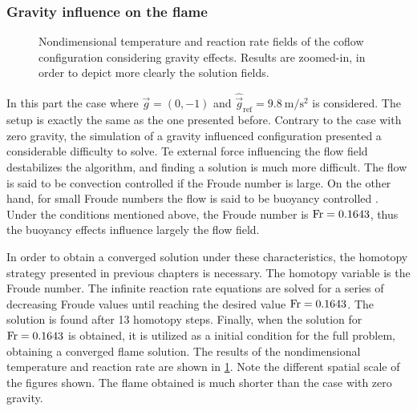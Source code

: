 \subsubsection{Gravity influence on the flame}
\begin{figure}[tbh!]
	\centering
	\pgfplotsset{width=0.35\textwidth, compat=1.3}
	\caption[Nondimensional temperature and reaction rate fields of the coflow configuration considering gravity effects.]{Nondimensional temperature and reaction rate fields of the coflow configuration considering gravity effects. Results are zoomed-in, in order to depict more clearly the solution fields.} \label{fig:CoFlowFlameFigWithGravity}
\end{figure}
In this part the case where $\vec{g} = (0, -1)$ and $\hat{\vec{g}}_{\text{ref}} = \SI{9.8}{\meter\per\square\second }$ is considered. The setup is exactly the same as the one presented before. Contrary to the case with zero gravity, the simulation of a gravity influenced configuration presented a considerable difficulty to solve. Te external force influencing the flow field destabilizes the algorithm, and finding a solution is much more difficult. The flow is said to be convection controlled if the Froude number is large. On the other hand, for small Froude numbers the flow is said to be buoyancy controlled . Under the conditions mentioned above, the Froude number is $\text{Fr} = 0.1643$, thus the buoyancy effects influence largely the flow field.

In order to obtain a converged solution under these characteristics, the homotopy strategy presented in previous chapters is necessary. The homotopy variable is the Froude number. The infinite reaction rate equations are solved for a series of decreasing Froude values until reaching the desired value $\text{Fr} = 0.1643$. The solution is found after 13 homotopy steps. Finally, when the solution for $\text{Fr} = 0.1643$ is obtained, it is utilized as a initial condition for the full problem, obtaining a converged flame solution. The results of the nondimensional temperature and reaction rate are shown in \cref{fig:CoFlowFlameFigWithGravity}. Note the different spatial scale of the figures shown. The flame obtained is much shorter than the case with zero gravity.
